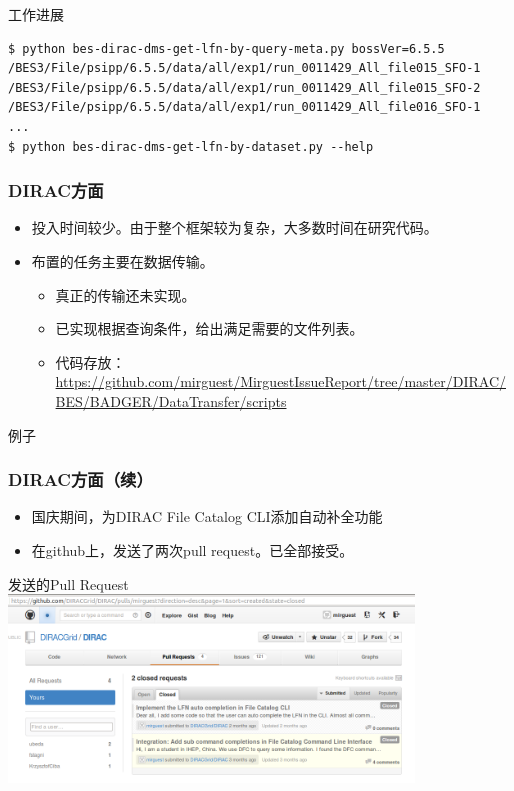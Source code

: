 
\begin{frame}
    \begin{center}
        \LARGE 工作进展
    \end{center}
\end{frame}

\newsavebox{\BADGERScript}
\begin{lrbox}{\BADGERScript}
\begin{lstlisting}
$ python bes-dirac-dms-get-lfn-by-query-meta.py bossVer=6.5.5
/BES3/File/psipp/6.5.5/data/all/exp1/run_0011429_All_file015_SFO-1
/BES3/File/psipp/6.5.5/data/all/exp1/run_0011429_All_file015_SFO-2
/BES3/File/psipp/6.5.5/data/all/exp1/run_0011429_All_file016_SFO-1
...
$ python bes-dirac-dms-get-lfn-by-dataset.py --help
\end{lstlisting}
\end{lrbox}

\begin{frame}
    \frametitle{DIRAC方面}
    \begin{itemize}
        \item 投入时间较少。由于整个框架较为复杂，大多数时间在研究代码。
        \item 布置的任务主要在数据传输。
            \begin{itemize}
                \item 真正的传输还未实现。
                \item 已实现根据查询条件，给出满足需要的文件列表。
                \item 代码存放：\url{https://github.com/mirguest/MirguestIssueReport/tree/master/DIRAC/BES/BADGER/DataTransfer/scripts}
            \end{itemize}
    \end{itemize}
    \begin{block}{例子}
        \par\usebox{\BADGERScript}
    \end{block}
\end{frame}

\begin{frame}
    \frametitle{DIRAC方面（续）}
    \begin{itemize}
        \item 国庆期间，为DIRAC File Catalog CLI添加自动补全功能
        \item 在github上，发送了两次pull request。已全部接受。
    \end{itemize}
    \begin{block}{发送的Pull Request}
        \includegraphics[height=5cm,keepaspectratio]{data/dirac_pull_request.png}
    \end{block}
\end{frame}

